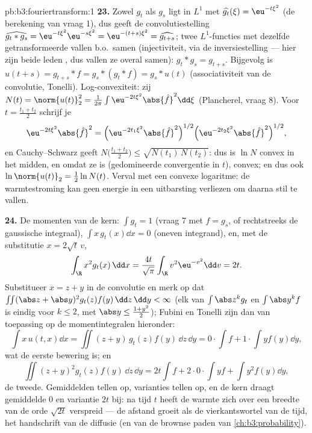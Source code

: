 \begin{solution}{pb:b3:fouriertransform:1}
\textbf{23.} Zowel $g_t$ als $g_s$ ligt in $L^1$ met
$\widehat{g_t}(\xi) = \eu^{-t\xi^2}$ (de berekening van vraag 1),
dus geeft de convolutiestelling $\widehat{g_t * g_s} =
\eu^{-t\xi^2}\eu^{-s\xi^2} = \eu^{-(t+s)\xi^2} =
\widehat{g_{t+s}}$; twee $L^1$-functies met dezelfde
getransformeerde vallen b.o.\ samen (injectiviteit, via de
inversiestelling --- hier zijn beide leden , dus vallen ze
overal samen): $g_t * g_s = g_{t+s}$. Bijgevolg is $u(t + s) =
g_{t+s} * f = g_s * (g_t * f) = g_s * u(t)$ (associativiteit van
de convolutie, Tonelli). Log-convexiteit: zij $N(t) =
\norm{u(t)}_2^2 = \frac1{2\pi}\int \eu^{-2t\xi^2}\abs{\hat
f}^2\dd\xi$ (Plancherel, vraag 8). Voor $t = \frac{t_1 + t_2}2$
schrijf je
\[
\eu^{-2t\xi^2}\abs{\hat f}^2
= \Bigl(\eu^{-2t_1\xi^2}\abs{\hat f}^2\Bigr)^{1/2}
\Bigl(\eu^{-2t_2\xi^2}\abs{\hat f}^2\Bigr)^{1/2},
\]
en Cauchy--Schwarz geeft $N\bigl(\frac{t_1+t_2}2\bigr) \leq
\sqrt{N(t_1)\,N(t_2)}$: dus is $\ln N$ convex in het midden, en
omdat ze  is (gedomineerde convergentie in $t$), convex;
en dus ook $\ln\norm{u(t)}_2 = \frac12\ln N(t)$. Verval met een
convexe logaritme: de warmtestroming kan geen energie in een
uitbarsting verliezen om daarna stil te vallen.

\textbf{24.} De momenten van de kern: $\int g_t = 1$ (vraag 7 met
$f = g_s$, of rechtstreeks de gaussische integraal), $\int
x\,g_t(x)\dd x = 0$ (oneven integrand), en, met de substitutie $x
= 2\sqrt t\,v$,
\[
\int_\R x^2g_t(x)\,\dd x
= \frac{4t}{\sqrt\pi}\int_\R v^2\eu^{-v^2}\dd v = 2t .
\]
Substitueer $x = z + y$ in de convolutie en merk op dat
$\iint(\abs z + \abs y)^2g_t(z)f(y)\,\dd z\,\dd y < \infty$ (elk
van $\int\abs z^kg_t$ en $\int\abs y^kf$ is eindig voor $k \leq
2$, met $\abs y \leq \frac{1 + y^2}2$); Fubini en Tonelli zijn
dan van toepassing op de momentintegralen hieronder:
\[
\int x\,u(t,x)\dd x = \iint (z + y)\,g_t(z)f(y)\,\dd z\,\dd
y = 0\cdot\!\int\! f + 1\cdot\!\int\! yf(y)\dd y,
\]
wat de eerste bewering is; en
\[
\iint (z+y)^2g_t(z)f(y)\,\dd z\,\dd y
= 2t\int f + 2\cdot0\cdot\!\int\! yf + \int y^2f(y)\dd y ,
\]
de tweede. Gemiddelden tellen op, varianties tellen op, en de
kern draagt gemiddelde $0$ en variantie $2t$ bij: na tijd $t$
heeft de warmte zich over een breedte van de orde $\sqrt{2t}$
verspreid --- de afstand groeit als de vierkantswortel van de
tijd, het handschrift van de diffusie (en van de brownse paden
van \cref{ch:b3:probability}).


\end{solution}
